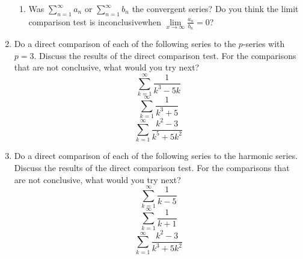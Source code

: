 \begin{enumerate}
\begin{enumerate}
\item Was $\displaystyle\sum\limits_{n = 1}^\infty  {a_n } $ or $\displaystyle\sum\limits_{n = 1}^\infty  {b_n } $ the convergent series?  Do you  think the limit comparison test is inconclusivewhen $\mathop {\lim }\limits_{x \to \infty } \frac{{a_n }}{{b_n }} = 0$?\end{enumerate}

\item Do a direct comparison of each of the following series to the $p$-series with $p = 3$.  Discuss the results of the direct comparison test.  For the comparisons that are not conclusive, what would you try next?$$\displaystyle\sum\limits_{k = 1}^\infty  {\frac{1}{{k^3  - 5k}}} $$	$$\displaystyle\sum\limits_{k = 1}^\infty  {\frac{1}{{k^3  + 5}}} $$	$$\displaystyle\sum\limits_{k = 1}^\infty  {\frac{{k^2  - 3}}{{k^5  + 5k^2 }}} $$


\item Do a direct comparison of each of the following series to the harmonic series.  Discuss the results of the direct comparison test.  For the comparisons that are not conclusive, what would you try next?$$
\displaystyle\sum\limits_{k = 1}^\infty  {\frac{1}{{k - 5}}} $$	$$
\displaystyle\sum\limits_{k = 1}^\infty  {\frac{1}{{k + 1}}} $$	$$
\displaystyle\sum\limits_{k = 1}^\infty  {\frac{{k^2  - 3}}{{k^3  + 5k^2 }}} $$


\end{enumerate}
